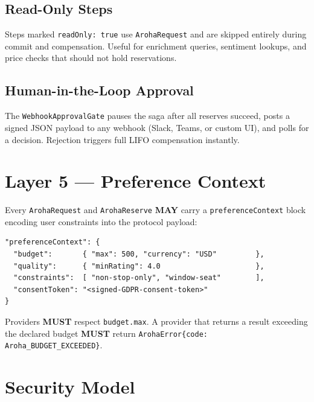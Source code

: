 \documentclass[11pt,a4paper]{article}
\begin{document}
\subsection{Read-Only Steps}

Steps marked \texttt{readOnly: true} use \texttt{ArohaRequest} and are skipped
entirely during commit and compensation. Useful for enrichment queries, sentiment
lookups, and price checks that should not hold reservations.

\subsection{Human-in-the-Loop Approval}

The \texttt{WebhookApprovalGate} pauses the saga after all reserves succeed, posts
a signed JSON payload to any webhook (Slack, Teams, or custom UI), and polls for
a decision. Rejection triggers full LIFO compensation instantly.

\section{Layer 5 --- Preference Context}

Every \texttt{ArohaRequest} and \texttt{ArohaReserve} \textbf{MAY} carry a
\texttt{preferenceContext} block encoding user constraints into the protocol payload:

\begin{lstlisting}[caption=Preference context block inside a ArohaRequest or ArohaReserve body]
"preferenceContext": {
  "budget":       { "max": 500, "currency": "USD"         },
  "quality":      { "minRating": 4.0                      },
  "constraints":  [ "non-stop-only", "window-seat"        ],
  "consentToken": "<signed-GDPR-consent-token>"
}
\end{lstlisting}

Providers \textbf{MUST} respect \texttt{budget.max}. A provider that returns a
result exceeding the declared budget \textbf{MUST} return
\texttt{ArohaError\{code: Aroha\_BUDGET\_EXCEEDED\}}.

\section{Security Model}
\end{document}
